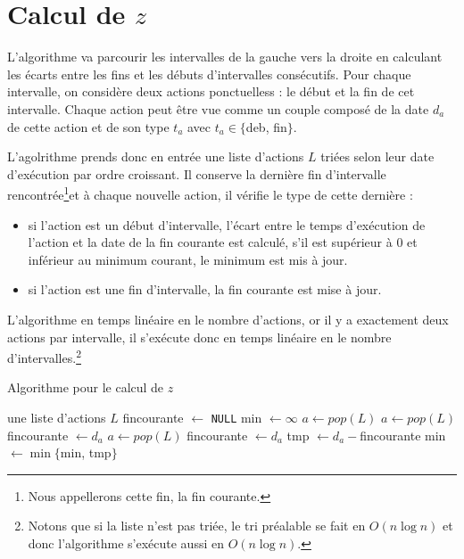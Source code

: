 \section{Calcul de $z$}
L'algorithme va parcourir les intervalles de la gauche vers la droite en calculant les écarts entre
les fins et les débuts d'intervalles consécutifs. Pour chaque intervalle, on considère deux
actions ponctuelless : le début et la fin de cet intervalle. Chaque action peut être vue comme un
couple composé de la date $d_a$ de cette action et de son type $t_a$ avec $t_a \in \{$deb, fin$\}$.

L'agolrithme prends donc en entrée une liste d'actions $L$ triées selon leur date d'exécution par ordre
croissant. Il conserve la dernière fin d'intervalle rencontrée\footnote{Nous appellerons cette fin,
la fin courante.}et à chaque nouvelle action, il vérifie le type de cette dernière :
\begin{itemize}
    \item si l'action est un début d'intervalle, l'écart entre le temps d'exécution de l'action et
        la date de la fin courante est calculé, s'il est supérieur à $0$ et inférieur au minimum
        courant, le minimum est mis à jour. 
    \item si l'action est une fin d'intervalle, la fin courante est mise à jour.
\end{itemize}

L'algorithme en temps linéaire en le nombre d'actions, or il y a exactement deux actions par
intervalle, il s'exécute donc en temps linéaire en le nombre d'intervalles.\footnote{Notons que si
    la liste n'est pas triée, le tri préalable se fait en $O(n \log n)$ et donc l'algorithme
s'exécute aussi en $O(n \log n)$.}

\begin{algorithm}
    \caption{Algorithme pour le calcul de $z$}
    \label{algo_calcul_z}
    \begin{algorithmic}[1]
        \Require une liste d'actions $L$
        \State fincourante $\gets$ \texttt{NULL} 
        \State min $\gets \infty$
        \State $a \gets pop(L)$
            \State $a \gets pop(L)$
        \EndWhile
        \State fincourante $\gets d_a$
        \State $a \gets pop(L)$
                \State fincourante $\gets d_a$
            \Else
                \State tmp $\gets d_a - $fincourante
                    \State min $\gets \min\{$min, tmp$\}$
                \EndIf
            \EndIf
        \EndWhile
    \end{algorithmic}
\end{algorithm}
                




